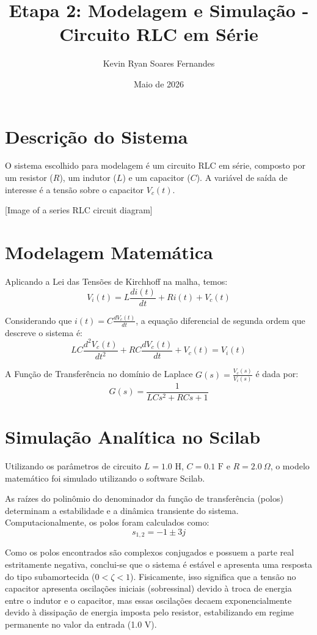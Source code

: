 \documentclass[12pt]{article}
\title{Etapa 2: Modelagem e Simulação - Circuito RLC em Série}
\author{Kevin Ryan Soares Fernandes}
\date{Maio de 2026}
\begin{document}
\maketitle

\section{Descrição do Sistema}
O sistema escolhido para modelagem é um circuito RLC em série, composto por um resistor ($R$), um indutor ($L$) e um capacitor ($C$). A variável de saída de interesse é a tensão sobre o capacitor $V_c(t)$.



[Image of a series RLC circuit diagram]


\section{Modelagem Matemática}
Aplicando a Lei das Tensões de Kirchhoff na malha, temos:
\begin{equation}
V_i(t) = L\frac{di(t)}{dt} + Ri(t) + V_c(t)
\end{equation}

Considerando que $i(t) = C\frac{dV_c(t)}{dt}$, a equação diferencial de segunda ordem que descreve o sistema é:
\begin{equation}
LC\frac{d^2V_c(t)}{dt^2} + RC\frac{dV_c(t)}{dt} + V_c(t) = V_i(t)
\end{equation}

A Função de Transferência no domínio de Laplace $G(s) = \frac{V_c(s)}{V_i(s)}$ é dada por:
\begin{equation}
G(s) = \frac{1}{LCs^2 + RCs + 1}
\end{equation}

\section{Simulação Analítica no Scilab}
Utilizando os parâmetros de circuito $L = 1.0\text{ H}$, $C = 0.1\text{ F}$ e $R = 2.0\ \Omega$, o modelo matemático foi simulado utilizando o software Scilab. 

As raízes do polinômio do denominador da função de transferência (polos) determinam a estabilidade e a dinâmica transiente do sistema. Computacionalmente, os polos foram calculados como:
\begin{equation}
s_{1,2} = -1 \pm 3j
\end{equation}

Como os polos encontrados são complexos conjugados e possuem a parte real estritamente negativa, conclui-se que o sistema é estável e apresenta uma resposta do tipo subamortecida ($0 < \zeta < 1$). Fisicamente, isso significa que a tensão no capacitor apresenta oscilações iniciais (sobressinal) devido à troca de energia entre o indutor e o capacitor, mas essas oscilações decaem exponencialmente devido à dissipação de energia imposta pelo resistor, estabilizando em regime permanente no valor da entrada (1.0 V).
\end{document}
